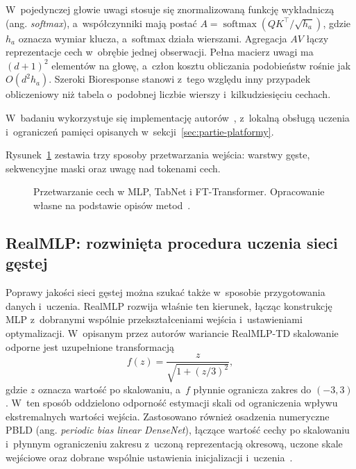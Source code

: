 W~pojedynczej głowie uwagi stosuje się znormalizowaną funkcję wykładniczą (ang. \textit{softmax}), a~współczynniki mają postać $A=\operatorname{softmax}(QK^\top/\sqrt{h_a})$, gdzie $h_a$ oznacza wymiar klucza, a~softmax działa wierszami. Agregacja $AV$ łączy reprezentacje cech w~obrębie jednej obserwacji. Pełna macierz uwagi ma $(d+1)^2$ elementów na głowę, a~człon kosztu obliczania podobieństw rośnie jak $O(d^2h_a)$. Szeroki Bioresponse stanowi z~tego względu inny przypadek obliczeniowy niż tabela o~podobnej liczbie wierszy i~kilkudziesięciu cechach.

W~badaniu wykorzystuje się implementację autorów~\cite{rtdlImplementation}, z~lokalną obsługą uczenia i~ograniczeń pamięci opisanych w~sekcji~\ref{sec:partie-platformy}.

Rysunek~\ref{fig:reprezentacje} zestawia trzy sposoby przetwarzania wejścia: warstwy gęste, sekwencyjne maski oraz uwagę nad tokenami cech.

\begin{figure}[!htbp]\centering\small

\caption{Przetwarzanie cech w MLP, TabNet i FT-Transformer. Opracowanie własne na podstawie opisów metod~\cite{gorishniy2021revisiting,arik2021tabnet}.}
\label{fig:reprezentacje}
\end{figure}

\subsection{RealMLP: rozwinięta procedura uczenia sieci gęstej}
\label{sec:realmlp}

Poprawy jakości sieci gęstej można szukać także w~sposobie przygotowania danych i~uczenia. RealMLP rozwija właśnie ten kierunek, łącząc konstrukcję MLP z~dobranymi wspólnie przekształceniami wejścia i~ustawieniami optymalizacji. W~opisanym przez autorów wariancie RealMLP-TD skalowanie odporne jest uzupełnione transformacją
\begin{equation}
f(z)=\frac{z}{\sqrt{1+(z/3)^2}},
\label{eq:realmlp-skalowanie}
\end{equation}
gdzie $z$ oznacza wartość po skalowaniu, a~$f$ płynnie ogranicza zakres do $(-3,3)$. W~ten sposób oddzielono odporność estymacji skali od ograniczenia wpływu ekstremalnych wartości wejścia. Zastosowano również osadzenia numeryczne PBLD (ang. \textit{periodic bias linear DenseNet}), łączące wartość cechy po skalowaniu i~płynnym ograniczeniu zakresu z~uczoną reprezentacją okresową, uczone skale wejściowe oraz dobrane wspólnie ustawienia inicjalizacji i~uczenia~\cite{holzmueller2024realmlp}.

